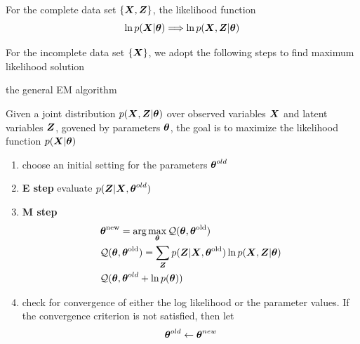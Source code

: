 \documentclass[11pt]{article}
\begin{document}
For the complete data set \(\left\{\boldsymbol{X},\boldsymbol{Z}\right\}\), the likelihood function
\begin{equation*}
\ln p(\boldsymbol{X}|\boldsymbol{\theta})\Longrightarrow \ln p(\boldsymbol{X},\boldsymbol{Z}|\boldsymbol{\theta})
\end{equation*}


For the incomplete data set \(\left\{\boldsymbol{X}\right\}\), we adopt the following steps to
find maximum likelihood solution


the general EM algorithm

Given a joint distribution \(p(\boldsymbol{X}, \boldsymbol{Z}|\boldsymbol{\theta})\) over observed variables
\(\boldsymbol{X}\) and latent variables \(\boldsymbol{Z}\), govened by parameters \(\boldsymbol{\theta}\), the goal
is to maximize the likelihood function \(p(\boldsymbol{X}|\boldsymbol{\theta})\)
\begin{enumerate}
\item choose an initial setting for the parameters \(\boldsymbol{\theta}^{old}\)
\item \textbf{E step} evaluate \(p(\boldsymbol{Z}|\boldsymbol{X},\boldsymbol{\theta}^{old})\)
\item \textbf{M step} 
\begin{align*}
&\boldsymbol{\theta}^\text{new}=\text{arg} \max_{\boldsymbol{\theta}}\mathcal{Q}(\boldsymbol{\theta},\boldsymbol{\theta}^\text{old})\\
&\mathcal{Q} (\boldsymbol{\theta},\boldsymbol{\theta}^\text{old})=
\displaystyle\sum_{\boldsymbol{Z}}p(\boldsymbol{Z}|\boldsymbol{X},\boldsymbol{\theta}^\text{old})\ln p(\boldsymbol{X},\boldsymbol{Z}|\boldsymbol{\theta})\\
&\mathcal{Q}(\boldsymbol{\theta},\boldsymbol{\theta}^{old}+\ln p(\boldsymbol{\theta}))
\end{align*}
\item check for convergence of either the log likelihood or the parameter
values. If the convergence criterion is not satisfied, then let
\begin{equation*}
\boldsymbol{\theta}^{old}\leftarrow \boldsymbol{\theta}^{new}
\end{equation*}
\end{enumerate}
\end{document}
